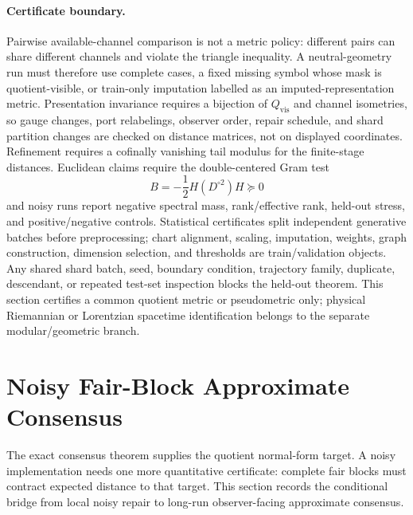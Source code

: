 \documentclass[11pt]{article}
\theoremstyle{remark}
\theoremstyle{plain}
\begin{document}
\paragraph{Certificate boundary.}
Pairwise available-channel comparison is not a metric policy: different pairs can share different
channels and violate the triangle inequality. A neutral-geometry run must therefore use complete
cases, a fixed missing symbol whose mask is quotient-visible, or train-only imputation labelled
as an imputed-representation metric. Presentation invariance requires a bijection of
\(Q_{\mathrm{vis}}\) and channel isometries, so gauge changes, port relabelings, observer order,
repair schedule, and shard partition changes are checked on distance matrices, not on displayed
coordinates. Refinement requires a cofinally vanishing tail modulus for the finite-stage
distances. Euclidean claims require the double-centered Gram test
\[
B=-\frac12H(D^{\circ2})H\succeq0
\]
and noisy runs report negative spectral mass, rank/effective rank, held-out stress, and
positive/negative controls. Statistical certificates split independent generative batches before
preprocessing; chart alignment, scaling, imputation, weights, graph construction, dimension
selection, and thresholds are train/validation objects. Any shared shard batch, seed, boundary
condition, trajectory family, duplicate, descendant, or repeated test-set inspection blocks the
held-out theorem. This section certifies a common quotient metric or pseudometric only; physical
Riemannian or Lorentzian spacetime identification belongs to the separate modular/geometric
branch.

\section{Noisy Fair-Block Approximate Consensus}
\label{sec:noisy-fair-block-consensus}

The exact consensus theorem supplies the quotient normal-form target. A noisy implementation
needs one more quantitative certificate: complete fair blocks must contract expected distance to
that target. This section records the conditional bridge from local noisy repair to long-run
observer-facing approximate consensus.
\end{document}

